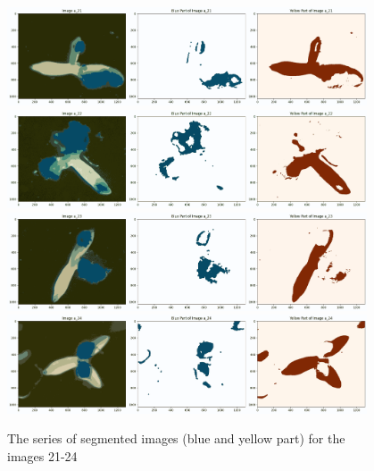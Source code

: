 \documentclass{article}
\begin{document}
\begin{figure}[h!]
\centering
\includegraphics[width=0.95\textwidth]{Report/Images/Appendix Images/ColorSegments/Image21.png}
\includegraphics[width=0.95\textwidth]{Report/Images/Appendix Images/ColorSegments/Image22.png}
\includegraphics[width=0.95\textwidth]{Report/Images/Appendix Images/ColorSegments/Image23.png}
\includegraphics[width=0.95\textwidth]{Report/Images/Appendix Images/ColorSegments/Image24.png}
\caption{The series of segmented images (blue and yellow part) for the images 21-24} 
\label{fig:segment21-24}
\end{figure}
\end{document}
